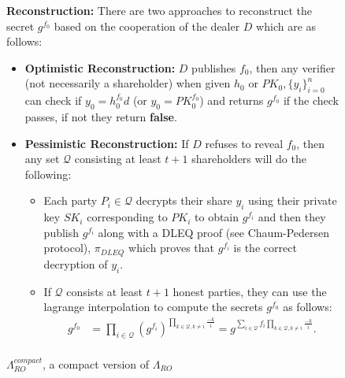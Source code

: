 \begin{figure}[ht]
{\begin{tcolorbox}[title=\textbf{$\Lambda_{RO}^{compact}$}, width=1.2\textwidth, colframe=blue!75!black, colback=blue!10, sharp corners]
        \vspace{0.5em}
        \textbf{Reconstruction:}
            There are two approaches to reconstruct the secret $g^{f_0}$ based on the cooperation 
            of the dealer $D$ which are as follows:
            \begin{itemize}
                \item \textbf{Optimistic Reconstruction:} $D$ publishes $f_0$, then any verifier (not necessarily a shareholder) 
                when given $h_0\text{ or }PK_0,\{y_i\}_{i=0}^n$ can check if $y_0=h_0^{f_0}d$ (or $y_0=PK_0^{f_0}$) 
                and returns $g^{f_0}$ if the check passes, if not they return \textbf{false}.
                \item \textbf{Pessimistic Reconstruction:} If $D$ refuses to reveal $f_0$, then any set 
                $\mathcal{Q}$ consisting at least $t+1$ shareholders will do the following:
                \begin{itemize}
                    \item Each party $P_i\in\mathcal{Q}$ decrypts their share $y_i$ using their private key $SK_i$ 
                      corresponding to $PK_i$ to obtain $g^{f_i}$ and then they publish $g^{f_i}$ 
                      along with a DLEQ proof (see Chaum-Pedersen protocol), $\pi_{DLEQ}$ which proves that 
                      $g^{f_i}$ is the correct decryption of $y_i$.
                    \item If $\mathcal{Q}$ consists at least $t+1$ honest parties, they can use the 
                    lagrange interpolation to compute the secrets $g^{f_0}$ as follows:
                    \begin{align*}
                        g^{f_0} &= \prod_{i\in\mathcal{Q}}(g^{f_i})^{\prod_{k\in\mathcal{Q},k\neq i}\frac{-k}{i}}= g^{\sum_{i\in\mathcal{Q}}f_i\prod_{k\in\mathcal{Q},k\neq i}\frac{-k}{i}}.\\
                    \end{align*}
                \end{itemize}
            \end{itemize}
    \end{tcolorbox}
    }
    \caption[PPPVSS]{$\Lambda_{RO}^{compact}$, a compact version of $\Lambda_{RO}$}
    \label{fig:compact-PPVSS-ro}
\end{figure}
